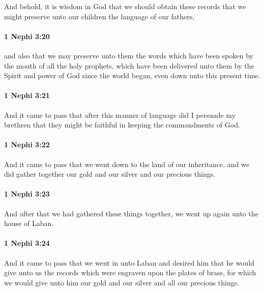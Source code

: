			And behold, it is wisdom in God that we should obtain these records
			that we might preserve unto our children the language of our fathers,

		\paragraph{1 Nephi 3:20} %
			\label{1NEPHI-3-20}

			and also that we may preserve unto them the words
			which have been spoken by the mouth of all the holy prophets,
			which have been delivered unto them by the Spirit and power of God
			since the world began, even down unto this present time.

		\paragraph{1 Nephi 3:21} %
			\label{1NEPHI-3-21}

			And it came to pass that after this manner of language
			did I persuade my brethren that they might be faithful
			in keeping the commandments of God.

		\paragraph{1 Nephi 3:22} %
			\label{1NEPHI-3-22}

			And it came to pass that we went down to the land of our inheritance,
			and we did gather together our gold and our silver and our precious things.

		\paragraph{1 Nephi 3:23} %
			\label{1NEPHI-3-23}

			And after that we had gathered these things together,
			we went up again unto the house of Laban.

		\paragraph{1 Nephi 3:24} %
			\label{1NEPHI-3-24}

			And it came to pass that we went in unto Laban and desired him
			that he would give unto us the records
			which were engraven upon the plates of brass,
			for which we would give unto him
			our gold and our silver and all our precious things.

